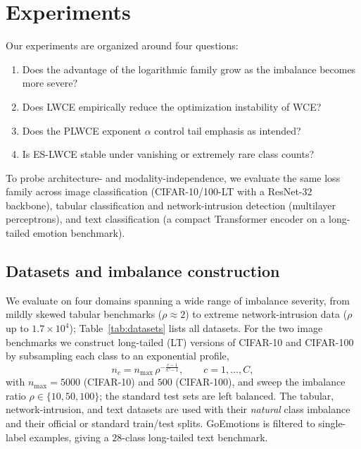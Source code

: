 \documentclass[a4paper,fleqn]{cas-sc}
\begin{document}
\section{Experiments}\label{sec:experiments}
Our experiments are organized around four questions:
\begin{enumerate}
\item Does the advantage of the logarithmic family grow as the imbalance becomes
      more severe?
\item Does LWCE empirically reduce the optimization instability of WCE?
\item Does the PLWCE exponent $\alpha$ control tail emphasis as intended?
\item Is ES-LWCE stable under vanishing or extremely rare class counts?
\end{enumerate}
To probe architecture- and modality-independence, we evaluate the same loss family
across image classification (CIFAR-10/100-LT with a ResNet-32 backbone), tabular
classification and network-intrusion detection (multilayer perceptrons), and text
classification (a compact Transformer encoder on a long-tailed emotion benchmark).

\subsection{Datasets and imbalance construction}\label{sec:datasets}
We evaluate on four domains spanning a wide range of imbalance severity, from mildly
skewed tabular benchmarks ($\rho\!\approx\!2$) to extreme network-intrusion data
($\rho$ up to $1.7\times10^{4}$); Table~\ref{tab:datasets} lists all datasets. For
the two image benchmarks we construct long-tailed (LT) versions of CIFAR-10 and
CIFAR-100 by subsampling each class to an exponential profile,
\begin{equation}\label{eq:lt-profile}
n_c = n_{\max}\,\rho^{-\frac{c-1}{C-1}}, \qquad c = 1,\ldots,C,
\end{equation}
with $n_{\max}=5000$ (CIFAR-10) and $500$ (CIFAR-100), and sweep the imbalance ratio
$\rho\in\{10,50,100\}$; the standard test sets are left balanced. The tabular,
network-intrusion, and text datasets are used with their \emph{natural} class
imbalance and their official or standard train/test splits. GoEmotions is filtered
to single-label examples, giving a $28$-class long-tailed text benchmark.
\end{document}
